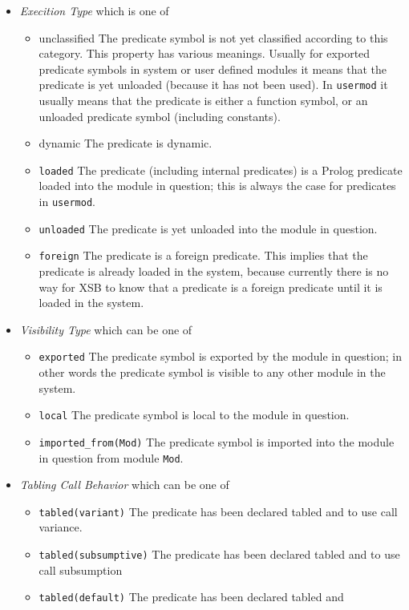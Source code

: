 \begin{description}
\begin{itemize}
\item{\em Execition Type} which is one of
\begin{itemize}
\item{unclassified} The predicate symbol is not yet classified
  according to this category. This property has various meanings.
  Usually for exported predicate symbols in system or user defined
  modules it means that the predicate is yet unloaded (because it has
  not been used).  In {\tt usermod} it usually means that the
  predicate is either a function symbol, or an unloaded predicate
  symbol (including constants).
%
\item{dynamic} The predicate is dynamic.
%
\item{\tt loaded} The predicate (including internal predicates) is a
  Prolog predicate loaded into the module in question; this is always
  the case for predicates in {\tt usermod}.
%
\item{\tt unloaded} The predicate is yet unloaded into the module in
  question.
\item{\tt foreign} The predicate is a foreign predicate. This implies
  that the predicate is already loaded in the system, because
  currently there is no way for XSB to know that a predicate is a
  foreign predicate until it is loaded in the system.
%
\end{itemize}
%
\item{\em Visibility Type} which can be one of
\begin{itemize}
\item{\tt exported} The predicate symbol is exported by the module in
  question; in other words the predicate symbol is visible to any
  other module in the system.
%
\item{\tt local} The predicate symbol is local to the module in
  question.
%
\item{\tt imported\_from(Mod)} The predicate symbol is imported into
  the module in question from module {\tt Mod}.
%
\end{itemize}
%
\item{\em Tabling Call Behavior} which can be one of 
\begin{itemize}
\item{\tt tabled(variant)} The predicate has been declared tabled and
  to use call variance.
%
\item{\tt tabled(subsumptive)} The predicate has been declared tabled and
  to use call subsumption
%
\item{\tt tabled(default)} The predicate has been declared tabled and

\end{itemize}
\end{itemize}
\end{description}
